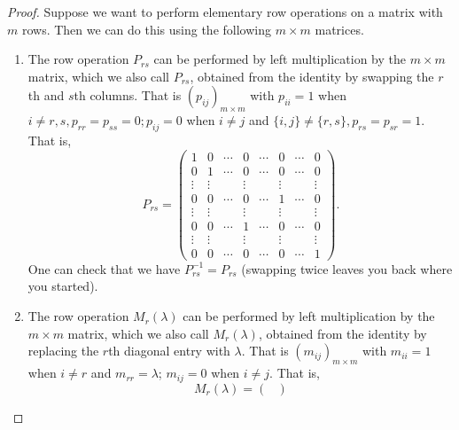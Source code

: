\documentclass[10pt, a4paper]{article}
\begin{document}
\begin{theorem}[continues = pre:linalg:thm:lintoech]
    \begin{proof}
        Suppose we want to perform elementary row operations on a matrix with $m$ rows.
        Then we can do this using the following $m \times m$ matrices.
        \begin{enumerate}[label = (\alph*)]
            \item The row operation $P_{rs}$ can be performed by left multiplication by the $m \times m$ matrix,
            which we also call $P_{rs}$,
            obtained from the identity by swapping the $r$th and $s$th columns.
            That is $(p_{ij})_{m \times m}$ with $p_{ii} = 1$ when $i \neq r, s, p_{rr} = p_{ss} = 0; p_{ij} = 0$ when $i \neq j$ and $\{i, j\} \neq \{r, s\}, p_{rs} = p_{sr} = 1$. That is,
            \[
            P_{rs} = \begin{pmatrix}
                1 & 0 & \dotsi & 0 & \dotsi & 0 & \dotsi & 0 \\
                0 & 1 & \dotsi & 0 & \dotsi & 0 & \dotsi & 0 \\
                \vdots & \vdots & \phantom{} & \vdots & \phantom{} & \vdots & \phantom{} & \vdots \\
                0 & 0 & \dotsi & 0 & \dotsi & 1 & \dotsi & 0 \\
                \vdots & \vdots & \phantom{} & \vdots & \phantom{} & \vdots & \phantom{} & \vdots \\
                0 & 0 & \dotsi & 1 & \dotsi & 0 & \dotsi & 0 \\
                \vdots & \vdots & \phantom{} & \vdots & \phantom{} & \vdots & \phantom{} & \vdots \\
                0 & 0 & \dotsi & 0 & \dotsi & 0 & \dotsi & 1
            \end{pmatrix}.
            \]
            One can check that we have $P_{rs} ^ {-1} = P_{rs}$ (swapping twice leaves you back where you started).
            \item
            The row operation $M_r(\lambda)$ can be performed by left multiplication by the $m \times m$ matrix,
            which we also call $M_r(\lambda)$,
            obtained from the identity by replacing the $r$th diagonal entry with $\lambda$.
            That is $(m_{ij})_{m \times m}$ with $m_{ii} = 1$ when $i \neq r$ and $m_{rr} = \lambda$; $m_{ij} = 0$ when $i \neq j$.
            That is,
            \[
            M_r(\lambda) = \begin{pmatrix}

\end{pmatrix}\]
\end{enumerate}
\end{proof}
\end{theorem}
\end{document}

